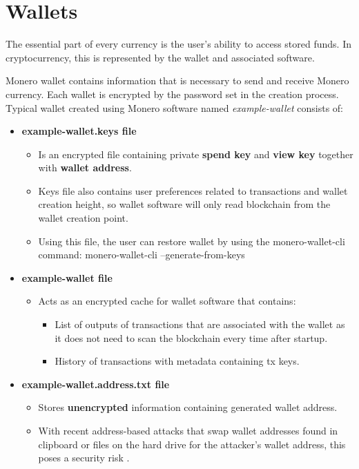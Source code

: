\documentclass[
  printed, %
  table,   %
  nolof,     %
  nolot,     %
           oneside, color
]{fithesis3}
\begin{document}
\section{Wallets}
The essential part of every currency is the user's ability to access stored funds. In cryptocurrency, this is represented by the wallet and associated software.

Monero wallet contains information that is necessary to send and receive Monero currency. Each wallet is encrypted by the password set in the creation process. Typical wallet created using Monero software named \textit{example-wallet} consists of:
\begin{itemize}\itemsep0em
\item \textbf{example-wallet.keys file}
\begin{itemize}\itemsep0em
\item Is an encrypted file containing private \textbf{spend key} and \textbf{view key} together with \textbf{wallet address}.
\item Keys file also contains user preferences related to transactions and wallet creation height, so wallet software will only read blockchain from the wallet creation point.
\item Using this file, the user can restore wallet by using the monero-wallet-cli command: monero-wallet-cli --generate-from-keys
\end{itemize}
\item \textbf{example-wallet file}
\begin{itemize}\itemsep0em
\item Acts as an encrypted cache for wallet software that contains:
\begin{itemize}\itemsep0em
\item List of outputs of transactions that are associated with the wallet as it does not need to scan the blockchain every time after startup.
\item History of transactions with metadata containing tx keys.
\end{itemize}
\end{itemize}
\item \textbf{example-wallet.address.txt file}
\begin{itemize}\itemsep0em
\item Stores \textbf{unencrypted} information containing generated wallet address.
\item With recent address-based attacks that swap wallet addresses found in clipboard or files on the hard drive for the attacker's wallet address, this poses a security risk \cite{cryptoshuffler}.

\end{itemize}
\end{itemize}
\end{document}
